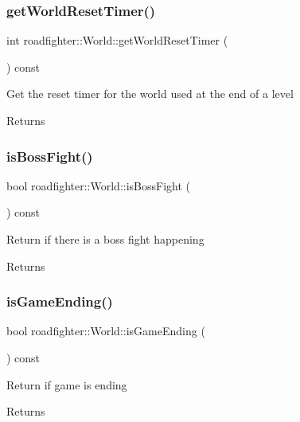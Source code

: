 \subsubsection{\texorpdfstring{get\+World\+Reset\+Timer()}{getWorldResetTimer()}}
{\footnotesize\ttfamily int roadfighter\+::\+World\+::get\+World\+Reset\+Timer (\begin{DoxyParamCaption}{ }\end{DoxyParamCaption}) const}

Get the reset timer for the world used at the end of a level \begin{DoxyReturn}{Returns}

\end{DoxyReturn}
\mbox{\label{classroadfighter_1_1World_aa4d900f9eb7bd623915087d1205308e7}} 
\subsubsection{\texorpdfstring{is\+Boss\+Fight()}{isBossFight()}}
{\footnotesize\ttfamily bool roadfighter\+::\+World\+::is\+Boss\+Fight (\begin{DoxyParamCaption}{ }\end{DoxyParamCaption}) const}

Return if there is a boss fight happening \begin{DoxyReturn}{Returns}

\end{DoxyReturn}
\mbox{\label{classroadfighter_1_1World_a813e7853ec9c47bc741ac79e6098f3e1}} 
\subsubsection{\texorpdfstring{is\+Game\+Ending()}{isGameEnding()}}
{\footnotesize\ttfamily bool roadfighter\+::\+World\+::is\+Game\+Ending (\begin{DoxyParamCaption}{ }\end{DoxyParamCaption}) const}

Return if game is ending \begin{DoxyReturn}{Returns}

\end{DoxyReturn}
\mbox{\label{classroadfighter_1_1World_a065d1588b466de04ec744d7872134d54}} 
